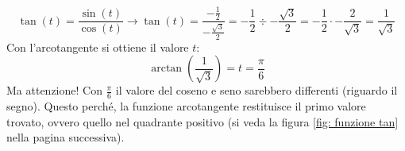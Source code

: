 \documentclass[a4paper]{article}
\begin{document}
	\begin{equation*}
		\tan\left(t\right) = \dfrac{\sin\left(t\right)}{\cos\left(t\right)} \rightarrow \tan\left(t\right) = \dfrac{-\frac{1}{2}}{-\frac{\sqrt{3}}{2}} = -\dfrac{1}{2} \div -\dfrac{\sqrt{3}}{2} = -\dfrac{1}{2} \cdot -\dfrac{2}{\sqrt{3}} = \dfrac{1}{\sqrt{3}}
	\end{equation*}
	Con l'arcotangente si ottiene il valore $t$:
	\begin{equation*}
		\arctan\left(\dfrac{1}{\sqrt{3}}\right) = t = \dfrac{\pi}{6}
	\end{equation*}
	Ma attenzione! Con $\frac{\pi}{6}$ il valore del coseno e seno sarebbero differenti (riguardo il segno). Questo perché, la funzione arcotangente restituisce il primo valore trovato, ovvero quello nel quadrante positivo (si veda la figura \ref{fig: funzione tan} nella pagina successiva).
	
\end{document}
